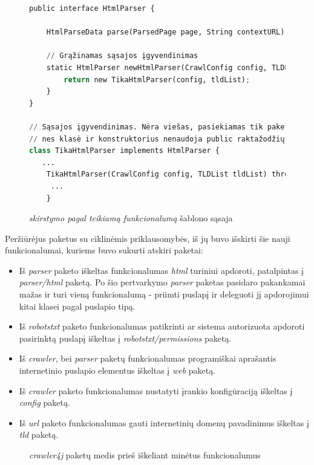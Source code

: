 \begin{figure}[H]
    \begin{lstlisting}[language=Python]
public interface HtmlParser {

    HtmlParseData parse(ParsedPage page, String contextURL) throws ParseException;

    // Grąžinamas sąsajos įgyvendinimas
    static HtmlParser newHtmlParser(CrawlConfig config, TLDList tldList) throws InstantiationException, IllegalAccessException  {
        return new TikaHtmlParser(config, tldList);
    }
}

// Sąsajos įgyvendinimas. Nėra viešas, pasiekiamas tik paketo viduje,
// nes klasė ir konstruktorius nenaudoja public raktažodžių
class TikaHtmlParser implements HtmlParser {
   ...
    TikaHtmlParser(CrawlConfig config, TLDList tldList) throws InstantiationException, IllegalAccessException {
     ...
    }
    \end{lstlisting}
    \caption{\textit{skirstymo pagal teikiamą funkcionalumą} šablono sąsaja}
\end{figure}
Peržiūrėjus paketus su ciklinėmis priklausomybės, iš jų buvo išskirti šie nauji funkcionalumai, kuriems
buvo sukurti atskiri paketai:
\begin{itemize}
    \item Iš \textit{parser} paketo iškeltas funkcionalumas \textit{html} turiniui apdoroti, patalpintas į \textit{parser/html} paketą.
    Po šio pertvarkymo \textit{parser} paketas pasidaro pakankamai mažas ir turi vieną funkcionalumą - priimti puslapį ir deleguoti jį apdorojimui kitai klasei pagal puslapio tipą.
    \item Iš \textit{robotstxt} paketo funkcionalumas patikrinti ar sistema autorizuota apdoroti pasirinktą puslapį iškeltas į \textit{robotstxt/permissions} paketą.
    \item Iš \textit{crawler}, bei \textit{parser} paketų funkcionalumas programiškai aprašantis internetinio puslapio elementus iškeltas į \textit{web} paketą.
    \item Iš \textit{crawler} paketo funkcionalumas nustatyti įrankio konfigūraciją iškeltas į \textit{config} paketą.
    \item Iš \textit{url} paketo funkcionalumas gauti internetinių domenų pavadinimus iškeltas į \textit{tld} paketą.
\end{itemize}

\begin{figure}[H]
    \snugshade
    \endsnugshade
    \caption{\textit{crawler4j} paketų medis prieš iškeliant minėtus funkcionalumus}
\end{figure}

